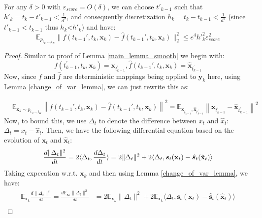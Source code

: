 \documentclass[10pt,a4paper]{amsart}
\def\rvx{{\mathbf{x}}}
\def\rvy{{\mathbf{y}}}
\def\vs{{\bm{s}}}
\def\vx{{\bm{x}}}
\newcommand{\E}{\mathbb{E}}
\begin{document}
\begin{lemma}
\label{main_lemma_non_smooth}
   For any $\delta>0$ with $\varepsilon_{score} = O(\delta)$, we can choose $t'_{k-1}$ such that $h'_k=t_{k}-t'_{k-1}  < \frac{1}{d^2}$, and consequently discretization 
$h_{k} = t_{k}-t_{k-1} < \frac{1}{d^2}$ (since $t'_{k-1}<t_{k-1}$ thus $h_k$<$h'_k$) and have:
\[
  \E_{p_{t_1,...,t_K}}  
  \|
  f(t_{k-1}',t_k,{\rvx}_k)-\hat{f}(t_{k-1}',t_k,{\rvx}_k)\|_2^2  \leq e^4{h'}_k^2\varepsilon^2_{score} 
\]
\end{lemma}

\begin{proof}
Similar to proof of Lemma \ref{main_lemma_smooth} we begin with:
\begin{equation*}
    f(t_{k-1}^\prime, t_k, \rvx_k) = \vx_{t_{k-1}^\prime},  \hat{f}(t_{k-1}',t_k,{\rvx}_k) = \hat{\vx}_{t^\prime_{k-1}}
\end{equation*}
Now, since $f$ and $\hat{f}$ are deterministic mappings being applied to $\rvy_k$ here, using {Lemma \ref{change_of_var_lemma}}, we can just rewrite this as:

\begin{equation*}
    \begin{aligned}
        &\E_{\rvx_k \sim {p}_{t_1,.., t_{K}}}\left\|f(t_{k-1}',t_k,{\rvx}_k)-\hat{f}(t_{k-1}',t_k,{\rvx}_k)\right\|^2 = \E_{\rvx_{t^\prime_{k-1}}, \hat{\rvx}_{t^\prime_{k-1}}}\left\|\rvx_{t^\prime_{k-1}} - \hat{\rvx}_{t^\prime_{k-1}} \right\|^2 
    \end{aligned}
\end{equation*}
Now, to bound this, we use $\Delta_t$ to denote the difference between $x_t$ and $\hat{x}_t$: $\Delta_t=x_t-\hat{x}_t$. Then, we have the following differential equation based on the evolution of $\rvx_t$ and $\hat{\rvx}_t$:
\[
\frac{d \|\Delta_t\|^2}{dt} = 2\langle\Delta_t, \frac{d \Delta_t}{dt}\rangle = 2\|\Delta_t\|^2 + 2\langle\Delta_t,\vs_t(\rvx_t)-\hat{\vs}_t(\hat{\rvx}_t)\rangle \\
\]
Taking expecation w.r.t. $\rvx_k$ and then using Lemma \ref{change_of_var_lemma}, we have:
\begin{equation*}
\begin{aligned}
\mathbb{E}_{\rvx_k} \frac{d \|\Delta_t\|^2}{dt}  = \frac{d \mathbb{E}_{\rvx_k}\|\Delta_t\|^2}{dt}  &= 2\mathbb{E}_{\rvx_k}\|\Delta_t\|^2 + 2\mathbb{E}_{\rvx_k}\langle\Delta_t,\vs_t(\rvx_t)-\hat{\vs}_t(\hat{\rvx}_t)\rangle \\
    \end{aligned}
\end{equation*}



\end{proof}
\end{document}
